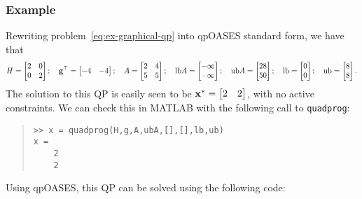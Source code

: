 \documentclass[10pt]{article}
\begin{document}
\subsubsection*{Example}
Rewriting problem~\eqref{eq:ex-graphical-qp} into qpOASES standard form, we have that
\begin{equation*}
H=\begin{bmatrix}2&0\\0&2\end{bmatrix}
;\quad
\mathbf{g}^\top=\begin{bmatrix}-4&-4\end{bmatrix}
;\quad
A=\begin{bmatrix}2&4\\5&5\end{bmatrix}
;\quad
\text{lb} A=\begin{bmatrix}-\infty\\-\infty\end{bmatrix}
;\quad
\text{ub} A=\begin{bmatrix}28\\50\end{bmatrix}
;\quad
\text{lb}=\begin{bmatrix}0\\0\end{bmatrix}
;\quad
\text{ub}=\begin{bmatrix}8\\8\end{bmatrix}.
\end{equation*}
The solution to this QP is easily seen to be $\mathbf{x}^*=\begin{bmatrix}2&2\end{bmatrix}$, with no active constraints.
We can check this in MATLAB with the following call to \texttt{quadprog}:
\begin{quote}
\begin{verbatim}
>> x = quadprog(H,g,A,ubA,[],[],lb,ub)
x =
    2
    2
\end{verbatim}
\end{quote}
Using qpOASES, this QP can be solved using the following code:
\end{document}
